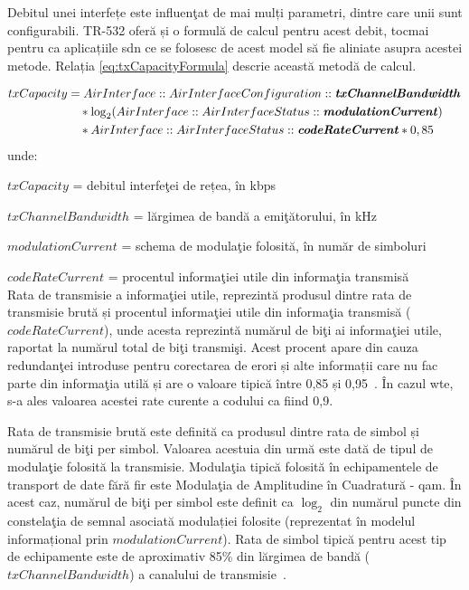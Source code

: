 Debitul unei interfețe este influenţat de mai mulți parametri, dintre care unii sunt configurabili. TR-532 \cite{onftr532} oferă și o formulă de calcul pentru acest debit, tocmai pentru ca aplicațiile \gls{sdn} ce se folosesc de acest model să fie aliniate asupra acestei metode. Relația \ref{eq:txCapacityFormula} descrie această metodă de calcul.

\begin{equation}\label{eq:txCapacityFormula}
\begin{split}
txCapacity& =AirInterface::AirInterfaceConfiguration::\textbf{\textit{txChannelBandwidth}}\\
& \quad * \log_{2}(AirInterface::AirInterfaceStatus::\textbf{\textit{modulationCurrent}})\\
& \quad * AirInterface::AirInterfaceStatus::\textbf{\textit{codeRateCurrent}} * 0,85
\end{split}
\end{equation}
unde:

$txCapacity$ = debitul interfeţei de rețea, în kbps

$txChannelBandwidth$ = lărgimea de bandă a emiţătorului, în kHz

$modulationCurrent$ = schema de modulaţie folosită, în număr de simboluri

$codeRateCurrent$ = procentul informaţiei utile din informaţia transmisă\\

Rata de transmisie a informaţiei utile, reprezintă produsul dintre rata de transmisie brută și procentul informaţiei utile din informaţia transmisă ($codeRateCurrent$), unde acesta reprezintă numărul de biţi ai informaţiei utile, raportat la numărul total de biţi transmişi. Acest procent apare din cauza redundanţei introduse pentru corectarea de erori și alte informații care nu fac parte din informaţia utilă și are o valoare tipică între 0,85 și 0,95~\cite{kizer2013digital}. În cazul \gls{wte}, s-a ales valoarea acestei rate curente a codului ca fiind 0,9.

Rata de transmisie brută este definită ca produsul dintre rata de simbol și numărul de biţi per simbol. Valoarea acestuia din urmă este dată de tipul de modulaţie folosită la transmisie. Modulaţia tipică folosită în echipamentele de transport de date fără fir este Modulaţia de Amplitudine în Cuadratură - \gls{qam}. În acest caz, numărul de biţi per simbol este definit ca $\log_{2}$ din numărul puncte din constelaţia de semnal asociată modulației folosite (reprezentat în modelul informațional prin $modulationCurrent$). Rata de simbol tipică pentru acest tip de echipamente este de aproximativ 85\% din lărgimea de bandă ($txChannelBandwidth$) a canalului de transmisie~\cite{kizer2013digital}.

